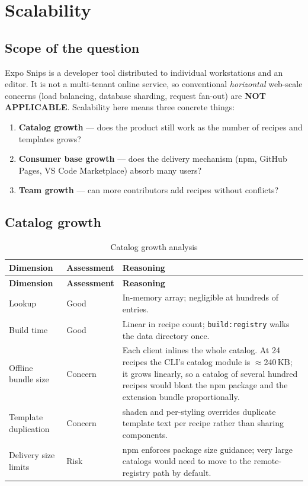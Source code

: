 \chapter{Scalability}
\label{ch:scalability}

\section{Scope of the question}

Expo Snips is a developer tool distributed to individual workstations and an
editor. It is not a multi-tenant online service, so conventional
\emph{horizontal} web-scale concerns (load balancing, database sharding, request
fan-out) are \textbf{NOT APPLICABLE}. Scalability here means three concrete
things:

\begin{enumerate}
  \item \textbf{Catalog growth} --- does the product still work as the number of
        recipes and templates grows?
  \item \textbf{Consumer base growth} --- does the delivery mechanism (npm,
        GitHub Pages, VS Code Marketplace) absorb many users?
  \item \textbf{Team growth} --- can more contributors add recipes without
        conflicts?
\end{enumerate}

\section{Catalog growth}

\begin{longtable}{@{}L{3.8cm}L{1.9cm}L{8.5cm}@{}}
\caption{Catalog growth analysis}\\
\toprule
\textbf{Dimension} & \textbf{Assessment} & \textbf{Reasoning} \\
\midrule
\endfirsthead
\toprule
\textbf{Dimension} & \textbf{Assessment} & \textbf{Reasoning} \\
\midrule
\endhead
Lookup & Good & In-memory array; negligible at hundreds of entries. \\
Build time & Good & Linear in recipe count; \texttt{build:registry} walks the
data directory once. \\
Offline bundle size & Concern & Each client inlines the whole catalog. At 24
recipes the CLI's catalog module is $\approx$240\,KB; it grows linearly, so a
catalog of several hundred recipes would bloat the npm package and the extension
bundle proportionally. \\
Template duplication & Concern & shadcn and per-styling overrides duplicate
template text per recipe rather than sharing components. \\
Delivery size limits & Risk & npm enforces package size guidance; very large
catalogs would need to move to the remote-registry path by default. \\
\bottomrule
\end{longtable}

